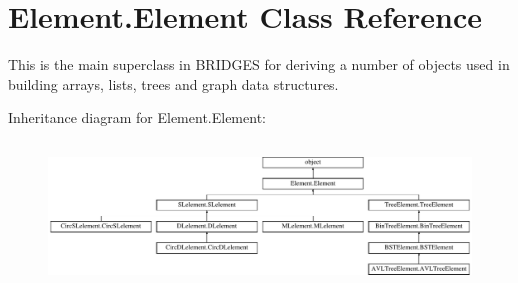 \hypertarget{class_element_1_1_element}{}\section{Element.\+Element Class Reference}
\label{class_element_1_1_element}


This is the main superclass in B\+R\+I\+D\+G\+E\+S for deriving a number of objects used in building arrays, lists, trees and graph data structures.  


Inheritance diagram for Element.\+Element\+:\begin{figure}[H]
\begin{center}
\leavevmode
\includegraphics[height=3.925234cm]{class_element_1_1_element}
\end{center}
\end{figure}
